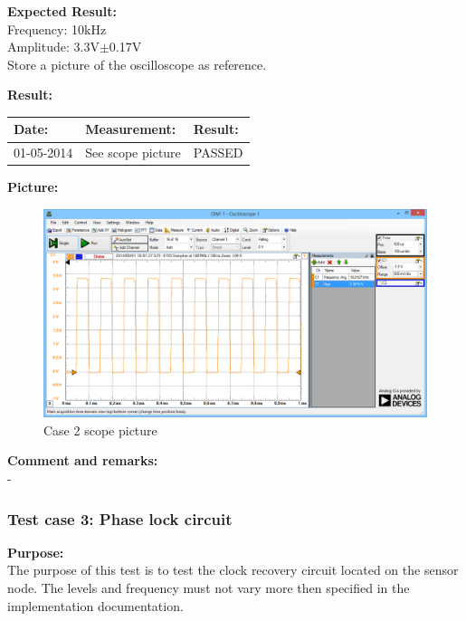 \textbf{Expected Result:}\\
Frequency: 10kHz\\
Amplitude: 3.3V$\pm$0.17V\\
Store a picture of the oscilloscope as reference.


\textbf{Result:}
\begin{table}[H]
\centering
\begin{tabular}{|p{2cm}|p{3cm}|p{2cm}|}\hline
\textbf{Date:} & \textbf{Measurement:} & \textbf{Result:} \\ \hline
01-05-2014 & See scope picture & PASSED \\ \hline
\end{tabular}
\end{table}
\textbf{Picture:}
\begin{figure}[H]
\centering
\includegraphics[width=.8\textwidth]{billeder/SN_Case2_osc_picture}
\caption{Case 2 scope picture}
\end{figure}
\textbf{Comment and remarks:}\\
-\\

\subsubsection{Test case 3: Phase lock circuit}
\textbf{Purpose:}\\
The purpose of this test is to test the clock recovery circuit located on the sensor node. The levels and frequency must not vary more then specified in the implementation documentation.\\


